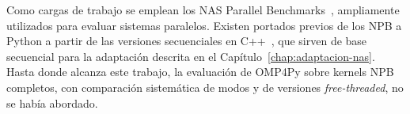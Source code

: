 Como cargas de trabajo se emplean los NAS Parallel Benchmarks~\cite{NPB1994},
ampliamente utilizados para evaluar sistemas paralelos. Existen portados previos
de los NPB a Python a partir de las versiones secuenciales en C++~\cite{NPBPython},
que sirven de base secuencial para la adaptación descrita en el
Capítulo~\ref{chap:adaptacion-nas}. Hasta donde alcanza este trabajo, la
evaluación de OMP4Py sobre kernels NPB completos, con comparación sistemática de
modos y de versiones \emph{free-threaded}, no se había abordado.

